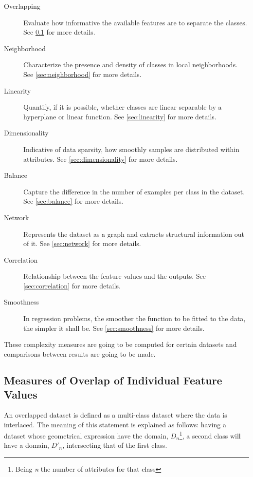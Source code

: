 \begin{description}
    \item [Overlapping] Evaluate how informative the available features are to 
    separate the classes. See \ref{sec:overlap} for more details.
    
    \item [Neighborhood] Characterize the presence and density of classes in 
    local neighborhoods. See \ref{sec:neighborhood} for more details.
    
    \item [Linearity] Quantify, if it is possible, whether classes are linear 
    separable by a hyperplane or linear function. See \ref{sec:linearity} for 
    more details.
    \item [Dimensionality] Indicative of data sparsity, how smoothly samples are
    distributed within attributes. See \ref{sec:dimensionality} for more details.
    \item [Balance] Capture the difference in the number of examples per class 
    in the dataset. See \ref{sec:balance} for more details.
    \item [Network] Represents the dataset as a graph and extracts structural 
    information out of it. See \ref{sec:network} for more details.
    \item [Correlation] Relationship between the feature values and the outputs.
    See \ref{sec:correlation} for more details. 
    \item [Smoothness] In regression problems, the smoother the function to be
    fitted to the data, the simpler it shall be. See \ref{sec:smoothness} for 
    more details.
\end{description}

These complexity measures are going to be computed for certain datasets and
comparisons between results are going to be made.

\subsection{Measures of Overlap of Individual Feature Values}\label{sec:overlap}

An overlapped dataset is defined as a multi-class dataset where the data is 
interlaced. The meaning of this statement is explained as follows: having a 
dataset whose geometrical expression have the domain, $D_n$\footnote{Being 
\textit{n} the number of attributes for that class}, a second class will have a 
domain, $D'_n$, intersecting that of the first class.


